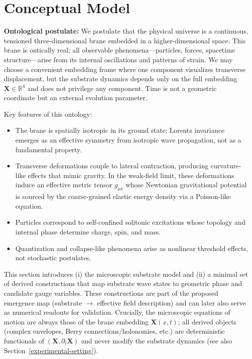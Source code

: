 \section{Conceptual Model}\label{conceptual-model}

\textbf{Ontological postulate:} We postulate that the physical universe is a continuous, tensioned three-dimensional brane embedded in a higher-dimensional space. This brane is ontically real; all observable phenomena—particles, forces, spacetime structure—arise from its internal oscillations and patterns of strain. We may choose a convenient embedding frame where one component visualizes transverse displacement, but the substrate dynamics depends only on the full embedding $\mathbf{X}\in\mathbb{R}^4$ and does not privilege any component. Time is not a geometric coordinate but an external evolution parameter.

Key features of this ontology:
\begin{itemize}
\item The brane is spatially isotropic in its ground state; Lorentz invariance emerges as an effective symmetry from isotropic wave propagation, not as a fundamental property.
\item Transverse deformations couple to lateral contraction, producing curvature-like effects that mimic gravity. In the weak-field limit, these deformations induce an effective metric tensor $g_{\mu\nu}$ whose Newtonian gravitational potential is sourced by the coarse-grained elastic energy density via a Poisson-like equation.
\item Particles correspond to self-confined solitonic excitations whose topology and internal phase determine charge, spin, and mass.
\item Quantization and collapse-like phenomena arise as nonlinear threshold effects, not stochastic postulates.
\end{itemize}

This section introduces (i) the microscopic substrate model and (ii) a minimal set of derived
constructions that map substrate wave states to geometric phase and candidate gauge variables.
These constructions are part of the proposed emergence map (substrate $\rightarrow$ effective field
description) and can later also serve as numerical readouts for validation.
Crucially, the microscopic equations of motion are always those of the brane embedding
$\mathbf X(x,t)$; all derived objects (complex envelopes, Berry connections/holonomies, etc.) are
deterministic functionals of $(\mathbf X,\partial_t\mathbf X)$ and never modify the substrate
dynamics (see also Section~\ref{experimental-setting}).

